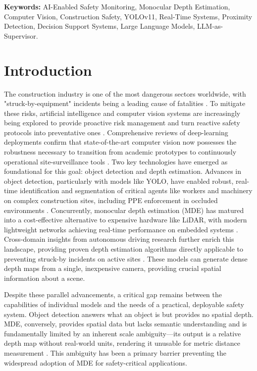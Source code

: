 \documentclass{article}
\begin{document}
\textbf{Keywords:} AI-Enabled Safety Monitoring, Monocular Depth Estimation, Computer Vision, Construction Safety, YOLOv11, Real-Time Systems, Proximity Detection, Decision Support Systems, Large Language Models, LLM-as-Supervisor.

\section{Introduction}
The construction industry is one of the most dangerous sectors worldwide, with "struck-by-equipment" incidents being a leading cause of fatalities \cite{pan2021}. To mitigate these risks, artificial intelligence and computer vision systems are increasingly being explored to provide proactive risk management and turn reactive safety protocols into preventative ones \cite{badhan2025, vasquez2025}. Comprehensive reviews of deep-learning deployments confirm that state-of-the-art computer vision now possesses the robustness necessary to transition from academic prototypes to continuously operational site-surveillance tools \cite{cai2025}. Two key technologies have emerged as foundational for this goal: object detection and depth estimation. Advances in object detection, particularly with models like YOLO, have enabled robust, real-time identification and segmentation of critical agents like workers and machinery on complex construction sites, including PPE enforcement in occluded environments \cite{he2024, zhang2024helmets, ge2025, pan2021}. Concurrently, monocular depth estimation (MDE) has matured into a cost-effective alternative to expensive hardware like LiDAR, with modern lightweight networks achieving real-time performance on embedded systems \cite{feng2024, masoumian2022, cheng2025, ma2026}. Cross-domain insights from autonomous driving research further enrich this landscape, providing proven depth estimation algorithms directly applicable to preventing struck-by incidents on active sites \cite{huang2025}. These models can generate dense depth maps from a single, inexpensive camera, providing crucial spatial information about a scene.

Despite these parallel advancements, a critical gap remains between the capabilities of individual models and the needs of a practical, deployable safety system. Object detection answers what an object is but provides no spatial depth. MDE, conversely, provides spatial data but lacks semantic understanding and is fundamentally limited by an inherent scale ambiguity—its output is a relative depth map without real-world units, rendering it unusable for metric distance measurement \cite{zhang2025, shen2023}. This ambiguity has been a primary barrier preventing the widespread adoption of MDE for safety-critical applications.
\end{document}
